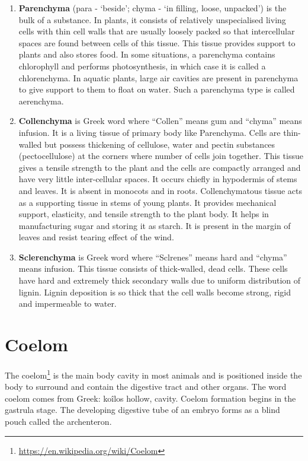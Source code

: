 \documentclass[]{book}
\providecommand{\tightlist}{%
  \setlength{\itemsep}{0pt}\setlength{\parskip}{0pt}}
\let\rmarkdownfootnote\footnote%
\def\footnote{\protect\rmarkdownfootnote}
\renewcommand{\href}[2]{#2\footnote{\url{#1}}}
\theoremstyle{definition}
\theoremstyle{definition}
\theoremstyle{definition}
\theoremstyle{remark}
\begin{document}
\begin{enumerate}
\def\labelenumi{\arabic{enumi}.}
\tightlist
\item
  \textbf{Parenchyma} (para - `beside'; chyma - `in filling, loose,
  unpacked') is the bulk of a substance. In plants, it consists of
  relatively unspecialised living cells with thin cell walls that are
  usually loosely packed so that intercellular spaces are found between
  cells of this tissue. This tissue provides support to plants and also
  stores food. In some situations, a parenchyma contains chlorophyll and
  performs photosynthesis, in which case it is called a chlorenchyma. In
  aquatic plants, large air cavities are present in parenchyma to give
  support to them to float on water. Such a parenchyma type is called
  aerenchyma.
\item
  \textbf{Collenchyma} is Greek word where ``Collen'' means gum and
  ``chyma'' means infusion. It is a living tissue of primary body like
  Parenchyma. Cells are thin-walled but possess thickening of cellulose,
  water and pectin substances (pectocellulose) at the corners where
  number of cells join together. This tissue gives a tensile strength to
  the plant and the cells are compactly arranged and have very little
  inter-cellular spaces. It occurs chiefly in hypodermis of stems and
  leaves. It is absent in monocots and in roots. Collenchymatous tissue
  acts as a supporting tissue in stems of young plants. It provides
  mechanical support, elasticity, and tensile strength to the plant
  body. It helps in manufacturing sugar and storing it as starch. It is
  present in the margin of leaves and resist tearing effect of the wind.
\item
  \textbf{Sclerenchyma} is Greek word where ``Sclrenes'' means hard and
  ``chyma'' means infusion. This tissue consists of thick-walled, dead
  cells. These cells have hard and extremely thick secondary walls due
  to uniform distribution of lignin. Lignin deposition is so thick that
  the cell walls become strong, rigid and impermeable to water.
\end{enumerate}

\section{Coelom}\label{coelom}

The \href{https://en.wikipedia.org/wiki/Coelom}{coelom} is the main body
cavity in most animals and is positioned inside the body to surround and
contain the digestive tract and other organs. The word coelom comes from
Greek: koîlos hollow, cavity. Coelom formation begins in the gastrula
stage. The developing digestive tube of an embryo forms as a blind pouch
called the archenteron.
\end{document}
